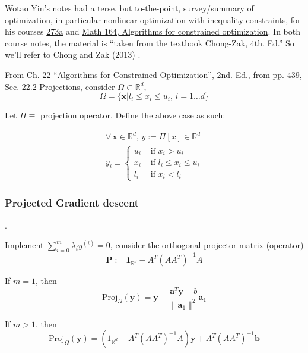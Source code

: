 \documentclass[10pt]{amsart}
\begin{document}
\begin{multicols*}{2}
Wotao Yin's notes had a terse, but to-the-point, survey/summary of optimization, in particular nonlinear optimization with inequality constraints, for his courses \href{http://www.math.ucla.edu/~wotaoyin/math273a/slides/Lec6_NLP_w_inequality_constraints_273a_2015_f.pdf}{273a} and \href{http://www.math.ucla.edu/~wotaoyin/math164/slides/wotao_yin_optimization_lec13_algorithms_for_constrained_optimization.pdf}{Math 164, Algorithms for constrained optimization}.  In both course notes, the material is ``taken from the textbook Chong-Zak, 4th. Ed.''  So we'll refer to Chong and Zak (2013) \cite{ChZa2013}.   

From Ch. 22 ``Algorithms for Constrained Optimization'', 2nd. Ed., from pp. 439, Sec. 22.2 Projections, consider $\Omega \subset \mathbb{R}^d$, \[
\Omega = \lbrace \mathbf{x} | l_i \leq x_i \leq u_i , \, i = 1\dots d\rbrace
\]

Let $\Pi \equiv $ projection operator.  Define the above case as such:

\[
\begin{gathered}
  \forall \, \mathbf{x} \in \mathbb{R}^d, \, y := \Pi[x] \in \mathbb{R}^d \\ 
  y_i \equiv \begin{cases} u_i & \text{ if } x_i > u_i \\
    x_i & \text{ if } l_i \leq x_i \leq u_i \\
    l_i & \text{ if } x_i < l_i \end{cases}
  \end{gathered}
\]







\subsubsection{Projected Gradient descent}.

Implement $\sum_{i=0}^m \lambda_i y^{(i)} = 0$, consider the orthogonal projector matrix (operator)
\begin{equation}
  \mathbf{P} := \mathbf{1}_{\mathbb{R}^d} - A^T(AA^T)^{-1}A
  \end{equation}





If $m=1$, then
\[
\text{Proj}_{\Omega}(\mathbf{y}) = \mathbf{y} - \frac{\mathbf{a}_1^T \mathbf{y} - b}{ \| \mathbf{a}_1 \|^2 } \mathbf{a}_1
\]

If $m>1$, then
\[
\text{Proj}_{\Omega}(\mathbf{y}) = (1_{\mathbb{R}^d} - A^T(AA^T)^{-1}A)\mathbf{y}+A^T(AA^T)^{-1}\mathbf{b}
\]


\end{multicols*}
\end{document}
